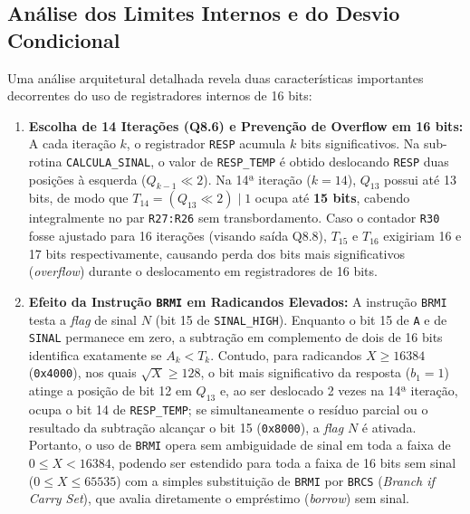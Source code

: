\documentclass[conference]{IEEEtran}
\begin{document}
\subsection{Análise dos Limites Internos e do Desvio Condicional}
Uma análise arquitetural detalhada revela duas características importantes decorrentes do uso de registradores internos de 16 bits:
\begin{enumerate}
	\item \textbf{Escolha de 14 Iterações (Q8.6) e Prevenção de Overflow em 16 bits:} A cada iteração $k$, o registrador \texttt{RESP} acumula $k$ bits significativos. Na sub-rotina \texttt{CALCULA\_SINAL}, o valor de \texttt{RESP\_TEMP} é obtido deslocando \texttt{RESP} duas posições à esquerda ($Q_{k-1} \ll 2$). Na 14ª iteração ($k = 14$), $Q_{13}$ possui até 13 bits, de modo que $T_{14} = (Q_{13} \ll 2) \mid 1$ ocupa até \textbf{15 bits}, cabendo integralmente no par \texttt{R27:R26} sem transbordamento. Caso o contador \texttt{R30} fosse ajustado para 16 iterações (visando saída Q8.8), $T_{15}$ e $T_{16}$ exigiriam 16 e 17 bits respectivamente, causando perda dos bits mais significativos (\textit{overflow}) durante o deslocamento em registradores de 16 bits.
	\item \textbf{Efeito da Instrução \texttt{BRMI} em Radicandos Elevados:} A instrução \texttt{BRMI} testa a \textit{flag} de sinal $N$ (bit 15 de \texttt{SINAL\_HIGH}). Enquanto o bit 15 de \texttt{A} e de \texttt{SINAL} permanece em zero, a subtração em complemento de dois de 16 bits identifica exatamente se $A_k < T_k$. Contudo, para radicandos $X \ge 16384$ (\texttt{0x4000}), nos quais $\sqrt{X} \ge 128$, o bit mais significativo da resposta ($b_1 = 1$) atinge a posição de bit 12 em $Q_{13}$ e, ao ser deslocado 2 vezes na 14ª iteração, ocupa o bit 14 de \texttt{RESP\_TEMP}; se simultaneamente o resíduo parcial ou o resultado da subtração alcançar o bit 15 (\texttt{0x8000}), a \textit{flag} $N$ é ativada. Portanto, o uso de \texttt{BRMI} opera sem ambiguidade de sinal em toda a faixa de $0 \le X < 16384$, podendo ser estendido para toda a faixa de 16 bits sem sinal ($0 \le X \le 65535$) com a simples substituição de \texttt{BRMI} por \texttt{BRCS} (\textit{Branch if Carry Set}), que avalia diretamente o empréstimo (\textit{borrow}) sem sinal.
\end{enumerate}
\end{document}
